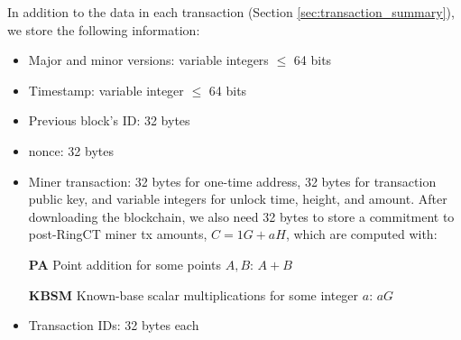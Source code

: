 In addition to the data in each transaction (Section \ref{sec:transaction_summary}), we store the following information:
\begin{itemize}
    \setlength\itemsep{\listspace}
    \item Major and minor versions: variable integers $\leq$ 64 bits
    \item Timestamp: variable integer $\leq$ 64 bits
    \item Previous block's ID: 32 bytes
    \item nonce: 32 bytes
    \item Miner transaction: 32 bytes for one-time address, 32 bytes for transaction public key, and variable integers for unlock time, height, and amount. After downloading the blockchain, we also need 32 bytes to store a commitment to post-RingCT miner tx amounts, $C = 1G + a H$, which are computed with:
    \item [\textbf{PA}] Point addition for some points $A, B$: $A + B$ \quad [1]
    \item [\textbf{KBSM}] Known-base scalar multiplications for some integer $a$: $a G$ \quad [2]
    \item Transaction IDs: 32 bytes each
\end{itemize}